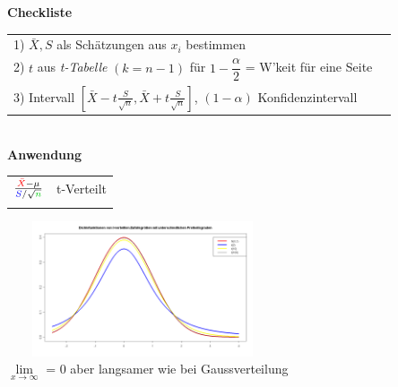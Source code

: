 	\begin{minipage}{11cm}
 		\textbf{Checkliste}\\
		\begin{tabular}{ll}
        1) $\bar{X}, S$ als Schätzungen aus $x_i$ bestimmen\\
        2) $t$ aus {\em t-Tabelle} $(k=n-1)$ für $1- \dfrac{\alpha}{2}$ = W'keit für eine Seite\\
        3) Intervall
        $\left[\bar{X}-t\frac{S}{\sqrt{n}},\bar{X}+t\frac{S}{\sqrt{n}}\right]$,
        $(1-\alpha)$ Konfidenzintervall
        \end{tabular}\\
		\textbf{Anwendung}\\
		\begin{tabular}{ll}
        $\frac{\textcolor{red}{\bar{X}}-\mu}{\textcolor{blue}{S}/\sqrt{\textcolor{green}{n}}}$
        & t-Verteilt\\ \\
        \end{tabular}
    
    \end{minipage}
	\begin{minipage}{10cm}
   		\includegraphics[width=8cm,height=4cm]{./bilder/T-Verteilung.png}\\
		$\lim\limits_{x\rightarrow \infty}$ = 0 aber langsamer wie bei
		Gaussverteilung 
    \end{minipage}

